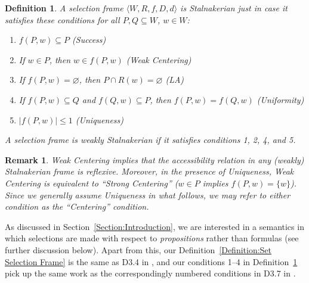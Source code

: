 \documentclass[12pt]{article}
\newtheorem{definition}{Definition}
\newtheorem{remark}{Remark}
\newcommand{\tup}[1]{\langle #1 \rangle}
\begin{document}
\begin{definition}
\label{Definition:Stalnakerian Function}
    A selection frame $\tup{ W,R,f,D,d}$ is \emph{Stalnakerian} just in case it satisfies these conditions for all $P,Q\subseteq W$, $w\in W$:
    \begin{enumerate}
        \item $f(P,w) \subseteq P$ \hfill (Success)
        \item If $w \in P$, then $w \in f(P,w)$ \hfill (Weak Centering)
        \item If $f(P,w) = \varnothing$, then $P \cap R(w) = \varnothing$ \hfill (LA)
        \item If $f(P,w) \subseteq Q$ and $f(Q,w) \subseteq P$, then $f(P,w) = f(Q,w)$ \hfill (Uniformity)
        \item $|f(P,w)| \leq 1$ \hfill (Uniqueness)
    \end{enumerate}
    A selection frame is \emph{weakly Stalnakerian} if it satisfies conditions 1, 2, 4, and 5.
\end{definition}

\begin{remark}
\label{Remark:Elementary Stalnakerian Properties}
    Weak Centering implies that the accessibility relation in any (weakly) Stalnakerian frame is reflexive. 
    Moreover, in the presence of Uniqueness, Weak Centering is equivalent to ``Strong Centering'' ($w \in P$ implies $f(P,w) = \{w\}$). 
    Since we generally assume Uniqueness in what follows, we may refer to either condition as the ``Centering'' condition. 
\end{remark}


As discussed in Section~\ref{Section:Introduction}, we are interested in a semantics in which selections are made with respect to \emph{propositions} rather than formulas (see further discussion below). 
Apart from this, our Definition~\ref{Definition:Set Selection Frame} is the same as D3.4 in \cite[p.~27]{StalnakerThomason1970}, and our conditions 1--4 in Definition~\ref{Definition:Stalnakerian Function} pick up the same work as the correspondingly numbered conditions in D3.7 in \cite[p.~29]{StalnakerThomason1970}. 
\end{document}
